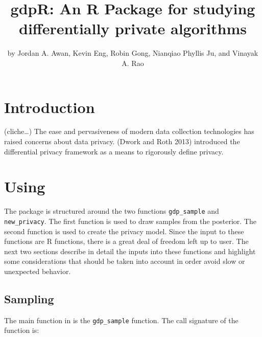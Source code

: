 \title{gdpR: An R Package for studying differentially private algorithms}


\author{by Jordan A. Awan, Kevin Eng, Robin Gong, Nianqiao Phyllis Ju, and Vinayak A. Rao}

\maketitle


\hypertarget{introduction}{%
\section{Introduction}\label{introduction}}

(cliche\ldots)
The ease and pervasiveness of modern data collection technologies has raised
concerns about data privacy. (Dwork and Roth 2013) introduced the differential privacy
framework as a means to rigorously define privacy.

\hypertarget{using}{%
\section{\texorpdfstring{Using }{Using }}\label{using}}

The package is structured around the two functions \texttt{gdp\_sample} and
\texttt{new\_privacy}. The first function is used to draw samples from the
posterior. The second function is used to create the privacy model. Since the
input to these functions are R functions, there is a great deal of freedom
left up to user. The next two sections describe in detail the inputs into
these functions and highlight some considerations that should be taken
into account in order avoid slow or unexpected behavior.

\hypertarget{sampling}{%
\subsection{Sampling}\label{sampling}}

The main function in  is the \texttt{gdp\_sample} function. The call
signature of the function is:

